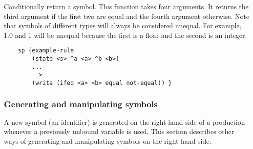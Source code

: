 \begin{description}
\item [\soarb{ifeq} --- ] 
	Conditionally return a symbol. This function takes four arguments. It returns the third argument if the first two are equal and the fourth argument otherwise. Note that symbols of different types will always be considered unequal. For example, 1.0 and 1 will be unequal because the first is a float and the second is an integer.

	\begin{verbatim}
	sp {example-rule
	    (state <s> ^a <a> ^b <b>)
	    ...
	    -->
	    (write (ifeq <a> <b> equal not-equal)) }
	\end{verbatim}
	
\end{description}

\subdivider
\subsubsection*{Generating and manipulating symbols}

A new symbol (an identifier) is generated on the right-hand side of a production whenever a previously unbound variable is used. This section describes other ways of generating and manipulating symbols on the right-hand side. 


